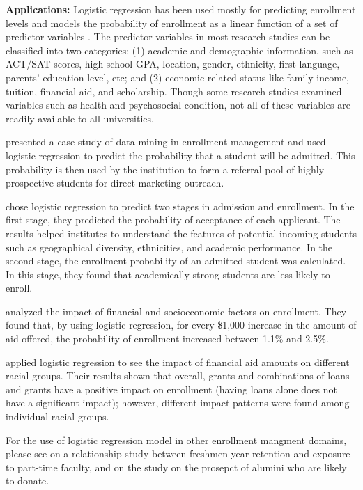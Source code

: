 \documentclass[12pt,english]{report}
\begin{document}
\vspace{0.25in}
\noindent \textbf{Applications:} Logistic regression has been used mostly for
predicting enrollment levels and models the probability of enrollment as a
linear function of a set of predictor variables \citep{lr_summary}. The
predictor variables in most research studies can be classified into two
categories: (1) academic and demographic information, such as ACT/SAT scores,
high school GPA, location, gender, ethnicity, first language, parents'
education level, etc; and (2) economic related status like family income,
tuition, financial aid, and scholarship. Though some research studies examined
variables such as health and psychosocial condition, not all of these variables
are readily available to all universities.

\citet{lr_1_chang} presented a case study of data mining in enrollment
management and used logistic regression to predict the probability that a
student will be admitted. This probability is then used by the institution to
form a referral pool of highly prospective students for direct marketing
outreach.

\citet{lr_2} chose logistic regression to predict two stages in admission and
enrollment. In the first stage, they predicted the probability of acceptance of
each applicant. The results helped institutes to understand the features of
potential incoming students such as geographical diversity, ethnicities, and
academic performance. In the second stage, the enrollment probability of an
admitted student was calculated. In this stage, they found that academically
strong students are less likely to enroll.

\citet{Braunstein1999} analyzed the impact of  financial and socioeconomic
factors on enrollment. They found that, by using logistic regression, for every
\$1,000 increase in the amount of aid offered, the probability of enrollment
increased between 1.1\% and 2.5\%.

\citet{lr_aid2} applied logistic regression to see the impact of financial aid
amounts on different racial groups. Their results shown that overall, grants
and combinations of loans and grants have a positive impact on enrollment
(having loans alone does not have a significant impact); however, different
impact patterns were found among individual racial groups.

For the use of logistic regression model in other enrollment mangment domains,
please see \citet{lr_retention2} on a relationship study between freshmen year
retention and exposure to part-time faculty, and \citep{lr_alumni1,lr_alumni2}
on the study on the prosepct of alumini who are likely to donate.
\end{document}
